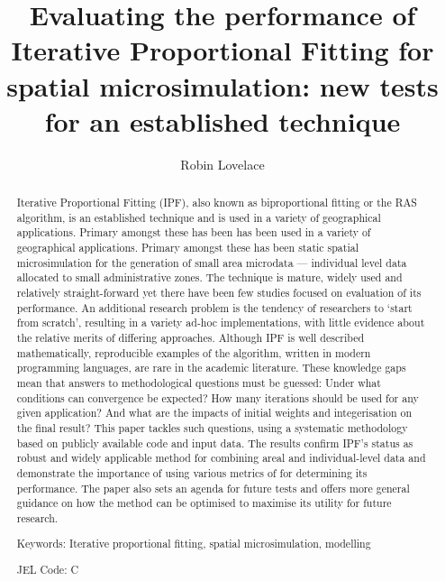 \documentclass[a4paper,10pt]{article}
\title{Evaluating the performance of Iterative Proportional Fitting for spatial microsimulation: new tests for an established technique}
\author{Robin Lovelace}
\begin{document}
\maketitle

\begin{abstract}
Iterative Proportional Fitting (IPF), also known as biproportional fitting or the RAS algorithm,
is an established technique and
is used in a variety of geographical applications. Primary amongst these has been
has been used in a variety of geographical applications. Primary amongst these has been
static spatial microsimulation for the generation of small area microdata --- individual
level data allocated to small administrative zones.
The technique is mature, widely used and relatively straight-forward
yet there have been few studies focused on evaluation of its performance.
An additional research problem is the tendency of 
researchers to `start from scratch', resulting in a variety ad-hoc implementations,
with little evidence about the relative merits of differing approaches.
Although IPF is well described mathematically, reproducible
examples of the algorithm, written in modern programming languages, are rare in the academic literature.
These knowledge gaps mean that answers to methodological questions must be guessed:
Under what conditions can convergence be expected?
How many iterations should be used for any given application? 
And what are the impacts of initial weights and integerisation on the final result?
This paper tackles such questions, using a systematic methodology 
based on publicly available code and input data. 
The results confirm IPF's status as robust and widely applicable 
method for combining areal and individual-level data and demonstrate the importance
of using various metrics of for determining its performance.
The paper also sets an agenda for future tests and offers more general guidance on how
the method can be optimised to maximise its utility for future research.

Keywords: Iterative proportional fitting, spatial microsimulation, modelling

JEL Code: C
\end{abstract}
\end{document}
